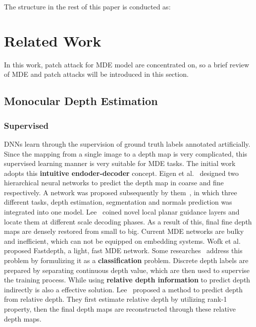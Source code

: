 \documentclass[10pt,twocolumn,letterpaper]{article}
\begin{document}
The structure in the rest of this paper is conducted as:

\section{Related Work}
In this work, patch attack for MDE model are concentrated on, 
so a brief review of MDE and patch attacks will be 
introduced in this section.

\subsection{Monocular Depth Estimation}
\subsubsection{Supervised}
DNNs learn through the supervision of ground truth labels 
annotated artificially. Since the mapping from a single image 
to a depth map is very complicated, this supervised learning 
manner is very suitable for MDE tasks. The initial work adopts 
this \textbf{intuitive endoder-decoder} concept. 
Eigen et al.~\cite{Eigen_2014_nips} designed two hierarchical 
neural networks to predict 
the depth map in coarse and fine respectively.
A network was proposed subsequently by them~\cite{Eigen_2015_ICCV}, 
in which three 
different tasks, depth estimation, segmentation and 
normals prediction was integrated into one model.
Lee~\cite{lee_2019_arxiv} coined novel local planar guidance layers and locate 
them at different scale decoding phases. 
As a result of this, final fine depth maps are densely 
restored from small to big.
Current MDE networks are bulky and inefficient, which can not
be equipped on embedding systems. Wofk et al.~\cite{Wofk_2019_ICRA} 
proposed Fastdepth,
a light, fast MDE network.
Some researches~\cite{Li_2018_ACCV,cao_2017_CSVT,Fu_2018_CVPR} 
address this problem by formulizing it as 
a \textbf{classification} problem. 
Discrete depth labels are prepared by separating 
continuous depth value, which are then used to supervise 
the training process.
While using \textbf{relative depth information} to predict depth 
indirectly is also a effective solution.
Lee~\cite{Lee_2019_CVPR} proposed a method to predict depth from relative depth. 
They first estimate relative depth by utilizing rank-1 property, 
then the final depth maps are reconstructed through these relative 
depth maps.
\end{document}
